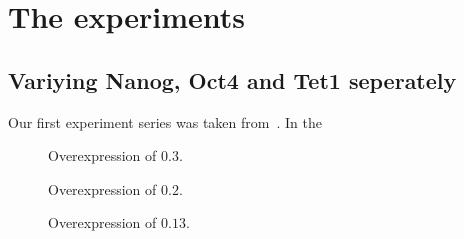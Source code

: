 \section{The experiments}

\subsection{Variying Nanog, Oct4 and Tet1 seperately}

Our first experiment series was taken from~\cite{Olariu2016}.
In the 

\begin{figure}
\centering
\begin{minipage}[t]{0.3\textwidth}
\centering
\graphicspath{{../Plots/}}

\end{minipage}
\hfill
\begin{minipage}[t]{0.3\textwidth}
\centering
\graphicspath{{../Plots/}}

\end{minipage}
\hspace*{0.2cm}
\begin{minipage}[t]{0.3\textwidth}
\centering
\graphicspath{{../Plots/}}

\end{minipage}
\caption{Overexpression of $0.3$.}
\label{pl:NOT_0.3}
\end{figure}

\begin{figure}
\centering
\begin{minipage}[t]{0.3\textwidth}
\centering
\graphicspath{{../Plots/}}

\end{minipage}
\hfill
\begin{minipage}[t]{0.3\textwidth}
\centering
\graphicspath{{../Plots/}}

\end{minipage}
\hspace*{0.2cm}
\begin{minipage}[t]{0.3\textwidth}
\centering
\graphicspath{{../Plots/}}

\end{minipage}
\caption{Overexpression of $0.2$.}
\label{pl:NOT_0.2}
\end{figure}

\begin{figure}
\centering
\begin{minipage}[t]{0.3\textwidth}
\centering
\graphicspath{{../Plots/}}

\end{minipage}
\hfill
\begin{minipage}[t]{0.3\textwidth}
\centering
\graphicspath{{../Plots/}}

\end{minipage}
\hspace*{0.2cm}
\begin{minipage}[t]{0.3\textwidth}
\centering
\graphicspath{{../Plots/}}

\end{minipage}
\caption{Overexpression of $0.13$.}
\label{pl:NOT_0.13}
\end{figure}

